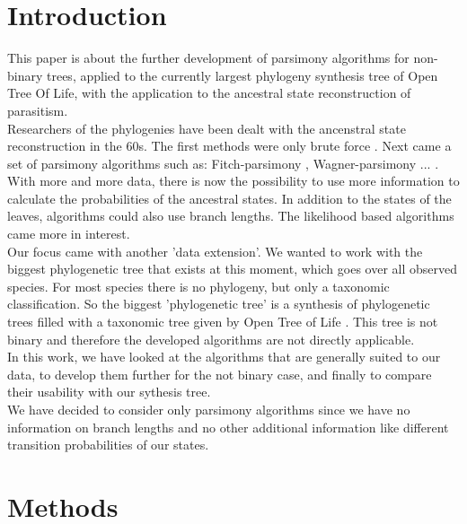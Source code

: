 \chapter{Introduction}
  This paper is about the further development of parsimony algorithms for non-binary trees, applied 
  to the currently largest phylogeny synthesis tree of Open Tree Of Life, with the application to 
  the ancestral state reconstruction of parasitism. \\
  Researchers of the phylogenies have been dealt with the ancenstral state reconstruction in the 
  60s. The first methods were only brute force . 
  Next came a set of parsimony algorithms such as: Fitch-parsimony \cite{Fitch1971}, 
  Wagner-parsimony \cite{Swofford1987} ... . \\
  With more and more data, there is now the possibility to use more information to calculate the 
  probabilities of the ancestral states. In addition to the states of the leaves, algorithms could 
  also use branch lengths. The likelihood based algorithms came more in interest. \\
  Our focus came with another 'data extension'. We wanted to work with the biggest phylogenetic tree 
  that exists at this moment, which goes over all observed species. For most  species there is no 
  phylogeny, but only a taxonomic classification. So the biggest 'phylogenetic tree' is a synthesis 
  of phylogenetic trees filled with a taxonomic tree given by Open Tree of Life \cite{Hinchliff2015}.
  This tree is not binary and therefore the developed algorithms are not directly applicable. \\
  In this work, we have looked at the algorithms that are generally suited to our data, to develop 
  them further for the not binary case, and finally to compare their usability with our sythesis 
  tree. \\
  We have decided to consider only parsimony algorithms since we have no information on branch 
  lengths and no other additional information like different transition probabilities of our states.

\chapter{Methods}
